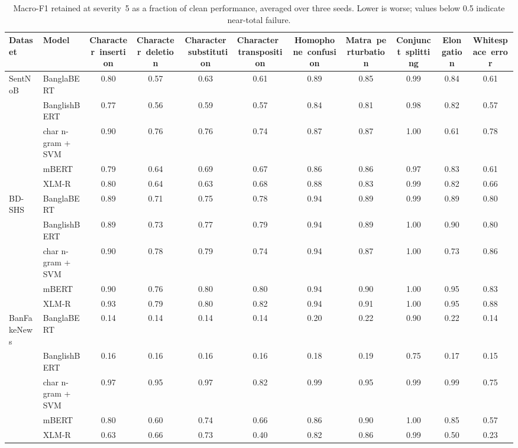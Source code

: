 \begin{table}[t]
\centering
\caption{Macro-F1 retained at severity~5 as a fraction of clean performance, averaged over three seeds. Lower is worse; values below 0.5 indicate near-total failure.}
\label{tab:retention}
\begin{tabular}{llccccccccc}
\toprule
Dataset & Model & Character~insertion & Character~deletion & Character~substitution & Character~transposition & Homophone~confusion & Matra~perturbation & Conjunct~splitting & Elongation & Whitespace~error \\
\midrule
SentNoB & BanglaBERT & 0.80 & 0.57 & 0.63 & 0.61 & 0.89 & 0.85 & 0.99 & 0.84 & 0.61 \\
 & BanglishBERT & 0.77 & 0.56 & 0.59 & 0.57 & 0.84 & 0.81 & 0.98 & 0.82 & 0.57 \\
 & char n-gram + SVM & 0.90 & 0.76 & 0.76 & 0.74 & 0.87 & 0.87 & 1.00 & 0.61 & 0.78 \\
 & mBERT & 0.79 & 0.64 & 0.69 & 0.67 & 0.86 & 0.86 & 0.97 & 0.83 & 0.61 \\
 & XLM-R & 0.80 & 0.64 & 0.63 & 0.68 & 0.88 & 0.83 & 0.99 & 0.82 & 0.66 \\
\midrule
BD-SHS & BanglaBERT & 0.89 & 0.71 & 0.75 & 0.78 & 0.94 & 0.89 & 0.99 & 0.89 & 0.80 \\
 & BanglishBERT & 0.89 & 0.73 & 0.77 & 0.79 & 0.94 & 0.89 & 1.00 & 0.90 & 0.80 \\
 & char n-gram + SVM & 0.90 & 0.78 & 0.79 & 0.74 & 0.94 & 0.87 & 1.00 & 0.73 & 0.86 \\
 & mBERT & 0.90 & 0.76 & 0.80 & 0.80 & 0.94 & 0.90 & 1.00 & 0.95 & 0.83 \\
 & XLM-R & 0.93 & 0.79 & 0.80 & 0.82 & 0.94 & 0.91 & 1.00 & 0.95 & 0.88 \\
\midrule
BanFakeNews & BanglaBERT & 0.14 & 0.14 & 0.14 & 0.14 & 0.20 & 0.22 & 0.90 & 0.22 & 0.14 \\
 & BanglishBERT & 0.16 & 0.16 & 0.16 & 0.16 & 0.18 & 0.19 & 0.75 & 0.17 & 0.15 \\
 & char n-gram + SVM & 0.97 & 0.95 & 0.97 & 0.82 & 0.99 & 0.95 & 0.99 & 0.99 & 0.75 \\
 & mBERT & 0.80 & 0.60 & 0.74 & 0.66 & 0.86 & 0.90 & 1.00 & 0.85 & 0.57 \\
 & XLM-R & 0.63 & 0.66 & 0.73 & 0.40 & 0.82 & 0.86 & 0.99 & 0.50 & 0.23 \\
\bottomrule
\end{tabular}
\end{table}

